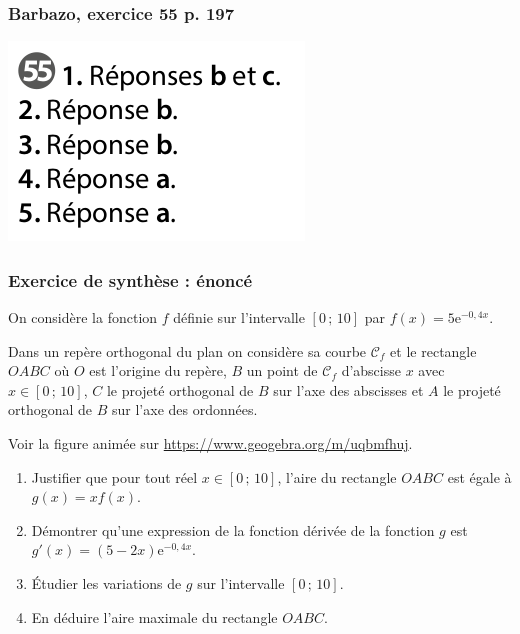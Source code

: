 \documentclass[11pt, hyperref={urlcolor=red,%
            linkcolor=blue, %
            colorlinks=true}]{beamer}
\newcommand{\Interff}[2]{\left[#1\, ;\, #2\right]}
\begin{document}
\begin{frame}
\frametitle{Barbazo, exercice 55 p. 197}
\label{exo55}
\begin{center}
	\includegraphics[scale=0.3]{exo55.png}
\end{center}


\end{frame}


\begin{frame}
\frametitle{Exercice de synthèse : énoncé}
\label{exosynthese}

On considère la fonction $f$ définie sur l'intervalle $\Interff{0}{10}$ par $f(x)=5\text{e}^{-0,4x}$.

Dans un repère orthogonal du plan on considère sa courbe $\mathcal{C}_{f}$ et le rectangle $OABC$ où $O$ est l'origine du repère, $B$ un point de $\mathcal{C}_{f}$ d'abscisse $x$ avec $x \in \Interff{0}{10}$, $C$ le projeté orthogonal de $B$ sur l'axe des abscisses et $A$ le projeté orthogonal de $B$ sur l'axe des ordonnées.

Voir la figure animée sur \href{https://www.geogebra.org/m/uqbmfhuj}{https://www.geogebra.org/m/uqbmfhuj}.

\begin{enumerate}
	\item Justifier que pour tout réel $x \in \Interff{0}{10}$, l'aire du rectangle $OABC$ est égale à $g(x)=xf(x)$.
	\item Démontrer qu'une expression de la fonction dérivée de la fonction $g$ est $g'(x)=(5-2x)\text{e}^{-0,4x}$.
	\item Étudier les variations de $g$ sur l'intervalle $\Interff{0}{10}$.
	\item En déduire l'aire maximale du rectangle $OABC$.
\end{enumerate}


\end{frame}
\end{document}
